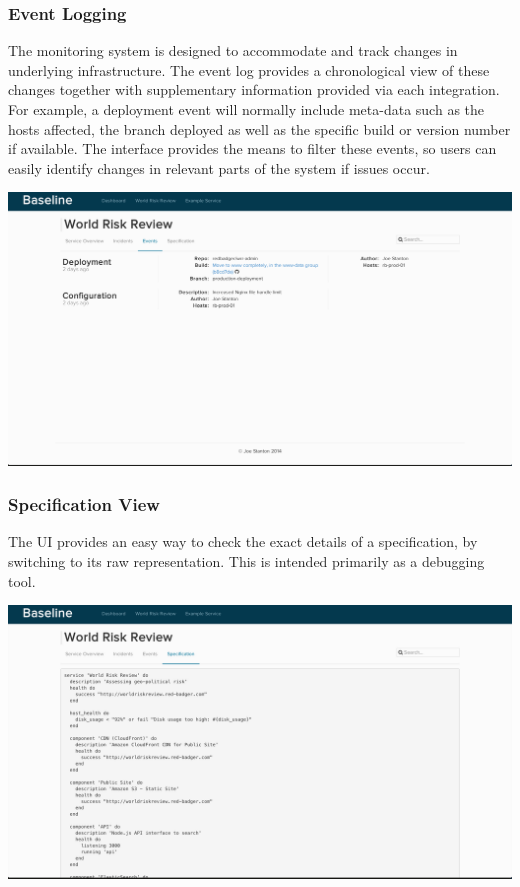 \documentclass{cshonours}
\begin{document}
\subsubsection{Event Logging}

The monitoring system is designed to accommodate and track changes in underlying infrastructure. The event log provides a chronological view of these changes together with supplementary information provided via each integration. For example, a deployment event will normally include meta-data such as the hosts affected, the branch deployed as well as the specific build or version number if available. The interface provides the means to filter these events, so users can easily identify changes in relevant parts of the system if issues occur.

\begin{center}
  \includegraphics[scale=0.28]{web-ui/events.png}
\end{center}

\subsubsection{Specification View}
The UI provides an easy way to check the exact details of a specification, by switching to its raw representation. This is intended primarily as a debugging tool.

\begin{center}
  \includegraphics[scale=0.28]{web-ui/specification.png}
\end{center}
\end{document}
